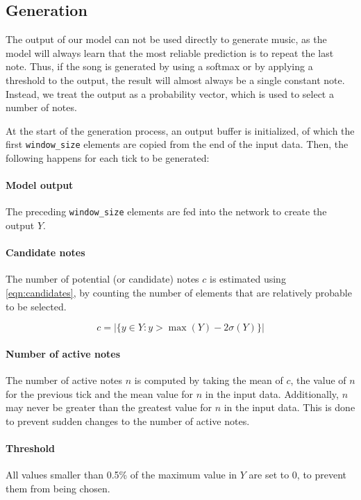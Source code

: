 \documentclass[11pt, twocolumn]{article}
\begin{document}
\subsection{Generation}
The output of our model can not be used directly to generate music, as the model will always learn that the most reliable prediction is to repeat the last note. Thus, if the song is generated by using a softmax or by applying a threshold to the output, the result will almost always be a single constant note. Instead, we treat the output as a probability vector, which is used to select a number of notes.

At the start of the generation process, an output buffer is initialized, of which the first \texttt{window\_size} elements are copied from the end of the input data. Then, the following happens for each tick to be generated:

\paragraph{Model output} The preceding \texttt{window\_size} elements are fed into the network to create the output $Y$. 

\paragraph{Candidate notes} The number of potential (or candidate) notes $c$ is estimated using \autoref{eqn:candidates}, by counting the number of elements that are relatively probable to be selected.

\begin{equation}\label{eqn:candidates}
    c = \lvert \{ y \in Y : y > \max(Y) - 2\sigma(Y) \} \rvert
\end{equation}


\paragraph{Number of active notes} The number of active notes $n$ is computed by taking the mean of $c$, the value of $n$ for the previous tick and the mean value for $n$ in the input data. Additionally, $n$ may never be greater than the greatest value for $n$ in the input data. This is done to prevent sudden changes to the number of active notes.

\paragraph{Threshold} All values smaller than 0.5\% of the maximum value in $Y$ are set to 0, to prevent them from being chosen.
\end{document}
